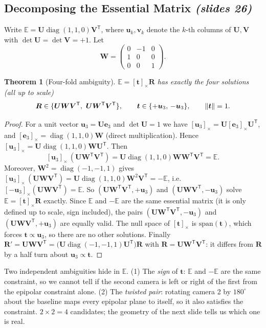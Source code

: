 \documentclass[11pt,a4paper]{article}
\newcommand{\slr}[1]{\texorpdfstring{\emph{(slides #1)}}{(slides #1)}}
\newcommand{\E}{\mathbb{E}}
\newcommand{\sk}[1]{[#1]_{\times}}
\newcommand{\tr}{^{\mathsf T}}
\DeclareMathOperator{\diag}{diag}
\theoremstyle{definition}
\theoremstyle{plain}
\newtheorem{theorem}[definition]{Theorem}
\theoremstyle{remark}
\begin{document}
\subsection{Decomposing the Essential Matrix \slr{26}}
Write $\E=\bm U\diag(1,1,0)\bm V\tr$, where $\bm u_k,\bm v_k$ denote the $k$-th columns of $\bm U,\bm V$ with $\det\bm U=\det\bm V=+1$. Let
\[
\bm W=\begin{pmatrix}0&-1&0\\1&0&0\\0&0&1\end{pmatrix}.
\]

\begin{theorem}[Four-fold ambiguity]\label{thm:decomp}
$\E=\sk{\bm t}\bm R$ has exactly the four solutions (all up to scale)
\[
\bm R\in\{\bm U\bm W\bm V\tr,\ \bm U\bm W\tr\bm V\tr\},\qquad \bm t\in\{+\bm u_3,\,-\bm u_3\},\qquad\norm{\bm t}=1 .
\]
\end{theorem}
\begin{proof}
For a unit vector $\bm u_3=\bm U\bm e_3$ and $\det\bm U=1$ we have $\sk{\bm u_3}=\bm U\sk{\bm e_3}\bm U\tr$, and $\sk{\bm e_3}=\diag(1,1,0)\bm W$ (direct multiplication). Hence
$\sk{\bm u_3}=\bm U\diag(1,1,0)\bm W\bm U\tr$. Then
\[
\sk{\bm u_3}\,(\bm U\bm W\tr\bm V\tr)=\bm U\diag(1,1,0)\bm W\bm W\tr\bm V\tr=\E .
\]
Moreover, $\bm W^2=\diag(-1,-1,1)$ gives $\sk{\bm u_3}\,(\bm U\bm W\bm V\tr)=\bm U\diag(1,1,0)\bm W^2\bm V\tr=-\E$, i.e.\ $\sk{-\bm u_3}(\bm U\bm W\bm V\tr)=\E$.
So $(\bm U\bm W\tr\bm V\tr,+\bm u_3)$ and $(\bm U\bm W\bm V\tr,-\bm u_3)$ solve $\E=\sk{\bm t}\bm R$ exactly. Since $\E$ and $-\E$ are the same essential matrix (it is only defined up to scale, sign included), the pairs
$(\bm U\bm W\tr\bm V\tr,-\bm u_3)$ and $(\bm U\bm W\bm V\tr,+\bm u_3)$ are equally valid. The null space of $\sk{\bm t}$ is $\mathrm{span}(\bm t)$, which forces $\bm t\propto\bm u_3$, so there are no other solutions.
Finally $\bm R'=\bm U\bm W\bm V\tr=\bigl(\bm U\diag(-1,-1,1)\bm U\tr\bigr)\bm R$ with $\bm R=\bm U\bm W\tr\bm V\tr$: it differs from $\bm R$ by a half turn about $\bm u_3\propto\bm t$.
\end{proof}

\begin{intuition}
Two independent ambiguities hide in $\E$. (1) The \emph{sign} of $\bm t$: $\E$ and $-\E$ are the same constraint, so we cannot tell if the second camera is left or right of the first from the epipolar constraint alone.
(2) The \emph{twisted pair}: rotating camera 2 by $180^\circ$ about the baseline maps every epipolar plane to itself, so it also satisfies the constraint. $2\times2=4$ candidates; the geometry of the next slide tells us which one is real.
\end{intuition}
\end{document}
